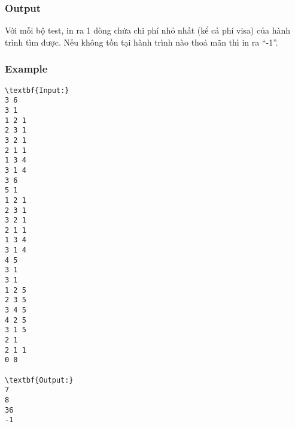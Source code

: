 \subsubsection{      Output     }

      Với mỗi bộ test, in ra 1 dòng chứa chi phí nhỏ nhất (kể cả phí visa) của hành trình tìm được. Nếu không tồn tại hành trình nào thoả mãn thì in ra “-1”.     

\subsubsection{      Example     }
\begin{verbatim}
\textbf{Input:}
3 6
3 1
1 2 1
2 3 1
3 2 1
2 1 1
1 3 4
3 1 4
3 6
5 1
1 2 1
2 3 1
3 2 1
2 1 1
1 3 4
3 1 4
4 5
3 1
3 1
1 2 5
2 3 5
3 4 5
4 2 5
3 1 5
2 1
2 1 1
0 0

\textbf{Output:}
7
8
36
-1\end{verbatim}

